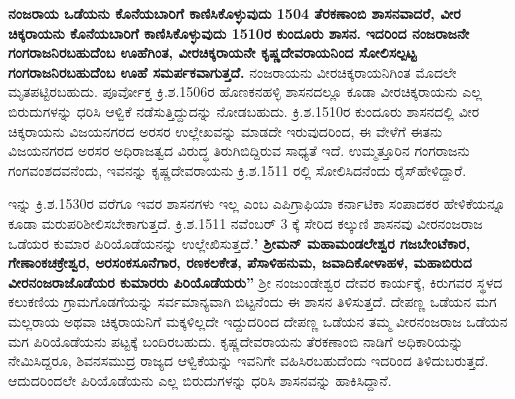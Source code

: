 \textbf{ನಂಜರಾಯ ಒಡೆಯನು ಕೊನೆಯಬಾರಿಗೆ ಕಾಣಿಸಿಕೊಳ್ಳುವುದು 1504 ತೆರಕಣಾಂಬಿ ಶಾಸನವಾದರೆ, ವೀರ\general{\break } ಚಿಕ್ಕರಾಯನು ಕೊನೆಯಬಾರಿಗೆ ಕಾಣಿಸಿಕೊಳ್ಳುವುದು 1510ರ ಕುಂದೂರು ಶಾಸನ.} \textbf{ಇದರಿಂದ ನಂಜರಾಜನೇ ಗಂಗರಾಜನಿರ\-ಬಹುದೆಂಬ ಊಹೆಗಿಂತ, ವೀರಚಿಕ್ಕರಾಯನೇ ಕೃಷ್ಣದೇವರಾಯನಿಂದ ಸೋಲಿಸಲ್ಪಟ್ಟ ಗಂಗರಾಜನಿರಬಹುದೆಂಬ ಊಹೆ\general{\break } ಸಮರ್ಪಕವಾಗುತ್ತದೆ.} ನಂಜರಾಯನು ವೀರಚಿಕ್ಕರಾಯನಿಗಿಂತ ಮೊದಲೇ ಮೃತಪಟ್ಟಿರಬಹುದು. ಪೂರ್ವೋಕ್ತ ಕ್ರಿ.ಶ.1506ರ ಹೊಣಕನಹಳ್ಳಿ ಶಾಸನದಲ್ಲೂ ಕೂಡಾ ವೀರಚಿಕ್ಕರಾಯನು ಎಲ್ಲ ಬಿರುದುಗಳನ್ನು ಧರಿಸಿ ಆಳ್ವಿಕೆ ನಡೆಸುತ್ತಿದ್ದುದನ್ನು ನೋಡಬಹುದು. ಕ್ರಿ.ಶ.1510ರ ಕುಂದೂರು ಶಾಸನದಲ್ಲಿ ವೀರ ಚಿಕ್ಕರಾಯನು ವಿಜಯನಗರದ ಅರಸರ ಉಲ್ಲೇಖವನ್ನು ಮಾಡದೇ ಇರುವುದರಿಂದ, ಈ ವೇಳೆಗೆ ಈತನು ವಿಜಯನಗರದ ಅರಸರ ಅಧಿರಾಜತ್ವದ ವಿರುದ್ಧ ತಿರುಗಿಬಿದ್ದಿರುವ ಸಾಧ್ಯತೆ ಇದೆ. ಉಮ್ಮತ್ತೂರಿನ ಗಂಗರಾಜನು ಗಂಗವಂಶದವನೆಂದು, ಇವನನ್ನು ಕೃಷ್ಣದೇವರಾಯನು ಕ್ರಿ.ಶ.1511 ರಲ್ಲಿ ಸೋಲಿಸಿದನೆಂದು ರೈಸ್​ ಹೇಳಿದ್ದಾರೆ.

ಇನ್ನು ಕ್ರಿ.ಶ.1530ರ ವರೆಗೂ ಇವರ ಶಾಸನಗಳು ಇಲ್ಲ ಎಂಬ ಎಪಿಗ್ರಾಫಿಯಾ ಕರ್ನಾಟಿಕಾ ಸಂಪಾದಕರ ಹೇಳಿಕೆಯನ್ನೂ ಕೂಡಾ ಮರುಪರಿಶೀಲಿಸಬೇಕಾಗುತ್ತದೆ. ಕ್ರಿ.ಶ.1511 ನವೆಂಬರ್​ 3 ಕ್ಕೆ ಸೇರಿದ ಕಲ್ಕುಣಿ ಶಾಸನವು ವೀರನಂಜರಾಜ ಒಡೆಯರ ಕುಮಾರ ಪಿರಿಯೊಡೆಯನನ್ನು ಉಲ್ಲೇಖಿಸುತ್ತದೆ.\textbf{' ಶ‍್ರೀಮನ್​ ಮಹಾಮಂಡಲೇಶ್ವರ ಗಜಬೇಂಟೆಕಾರ, ಗೇಣಾಂಕಚಕ್ರೇಶ್ವರ, ಅರಸಂಕಸೂನೆಗಾರ, ರಣಕಲಕೇತ, ಪೆಸಾಳಿಹನುಮ, ಜವಾದಿಕೋಳಾಹಳ, ಮಹಾಬಿರುದ\general{\break } ವೀರನಂಜರಾಜೊಡೆಯರ ಕುಮಾರರು ಪಿರಿಯೊಡೆಯರು''} ಶ‍್ರೀ ನಂಜುಂಡೇಶ್ವರ ದೇವರ ಕಾರ್ಯಕ್ಕೆ, ಕಿರುಗವರ ಸ್ಥಳದ ಕಲುಕಣಿಯ ಗ್ರಾಮಗೊಡಗೆಯನ್ನು ಸರ್ವಮಾನ್ಯವಾಗಿ ಬಿಟ್ಟನೆಂದು ಈ ಶಾಸನ ತಿಳಿಸುತ್ತದೆ. ದೇಪಣ್ಣ ಒಡೆಯನ ಮಗ ಮಲ್ಲರಾಯ ಅಥವಾ ಚಿಕ್ಕರಾಯನಿಗೆ ಮಕ್ಕಳಿಲ್ಲದೇ ಇದ್ದುದರಿಂದ ದೇಪಣ್ಣ ಒಡೆಯನ ತಮ್ಮ ವೀರನಂಜರಾಜ ಒಡೆಯನ ಮಗ ಪಿರಿಯೊಡೆಯನು ಪಟ್ಟಕ್ಕೆ ಬಂದಿರಬಹುದು. ಕೃಷ್ಣದೇವರಾಯನು ತೆರಕಣಾಂಬಿ ನಾಡಿಗೆ ಅಧಿಕಾರಿಯನ್ನು ನೇಮಿಸಿದ್ದರೂ, ಶಿವನಸಮುದ್ರ ರಾಜ್ಯದ ಆಳ್ವಿಕೆಯನ್ನು ಇವನಿಗೇ ವಹಿಸಿರಬಹುದೆಂದು ಇದರಿಂದ ತಿಳಿದುಬರುತ್ತದೆ. ಆದುದರಿಂದಲೇ ಪಿರಿಯೊಡೆಯನು ಎಲ್ಲ ಬಿರುದುಗಳನ್ನು ಧರಿಸಿ ಶಾಸನವನ್ನು ಹಾಕಿಸಿದ್ದಾನೆ.

